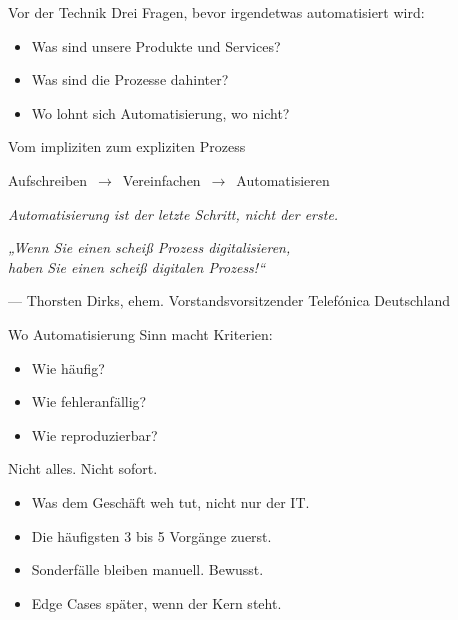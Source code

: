 \documentclass[aspectratio=1610,14pt]{beamer}
\begin{document}
  \begin{frame}{Vor der Technik}
    Drei Fragen, bevor irgendetwas automatisiert wird:
    \begin{itemize}
      \item Was sind unsere Produkte und Services?
      \item Was sind die Prozesse dahinter?
      \item Wo lohnt sich Automatisierung, wo nicht?
    \end{itemize}
  \end{frame}

  \begin{frame}{Vom impliziten zum expliziten Prozess}
    \vfill
    \begin{center}
      Aufschreiben \,{\color{copper}$\to$}\, Vereinfachen \,{\color{copper}$\to$}\, Automatisieren
    \end{center}
    \vfill
    {\color{mute}\itshape Automatisierung ist der letzte Schritt, nicht der erste.}
  \end{frame}

  \begin{frame}{}
    \vfill
    \begin{center}
      \begin{minipage}{0.82\paperwidth}
        \centering\itshape
        „Wenn Sie einen scheiß Prozess digitalisieren,\\
        haben Sie einen scheiß digitalen Prozess!“
      \end{minipage}
    \end{center}
    \vfill
    \begin{flushright}
      {\color{mute}— Thorsten Dirks, ehem. Vorstandsvorsitzender Telefónica Deutschland}
    \end{flushright}
  \end{frame}

  \begin{frame}{Wo Automatisierung Sinn macht}
    Kriterien:
    \begin{itemize}
      \item Wie häufig?
      \item Wie fehleranfällig?
      \item Wie reproduzierbar?
    \end{itemize}
  \end{frame}

  \begin{frame}{Nicht alles. Nicht sofort.}
    \begin{itemize}
      \item Was dem Geschäft weh tut, nicht nur der IT.
      \item Die häufigsten 3 bis 5 Vorgänge zuerst.
      \item Sonderfälle bleiben manuell. Bewusst.
      \item Edge Cases später, wenn der Kern steht.
    \end{itemize}
  \end{frame}
\end{document}
